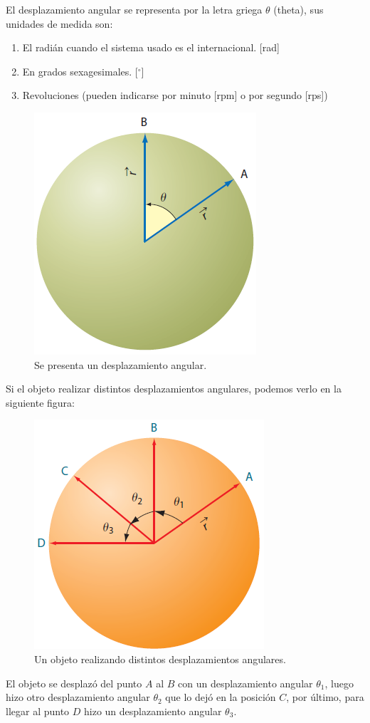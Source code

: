 \documentclass[12pt]{article}
\begin{document}
\begin{enumerate}
El desplazamiento angular se representa por la letra griega $\theta$ (theta),  sus unidades de medida son: 
\begin{enumerate}
\item El radián cuando el sistema usado es el internacional. [\unit{\radian}]
\item En grados sexagesimales. [${}^{\circ}$]
\item Revoluciones (pueden indicarse por minuto [rpm] o por segundo [rps])
\end{enumerate}
\begin{figure}[H]
    \centering
    \includegraphics[scale=0.75]{Imagenes/Movimiento_Circular_01.png}
    \caption{Se presenta un desplazamiento angular.}
\end{figure}
Si el objeto realizar distintos desplazamientos angulares, podemos verlo en la siguiente figura:
\begin{figure}[H]
    \centering
    \includegraphics[scale=0.75]{Imagenes/Movimiento_Circular_02.png}
    \caption{Un objeto realizando distintos desplazamientos angulares.}
\end{figure}
El objeto se desplazó del punto $A$ al $B$ con un desplazamiento angular $\theta_{1}$, luego hizo otro desplazamiento angular $\theta_{2}$ que lo dejó en la posición $C$, por último, para llegar al punto $D$ hizo un desplazamiento angular $\theta_{3}$.
\end{enumerate}    
    
\end{document}
